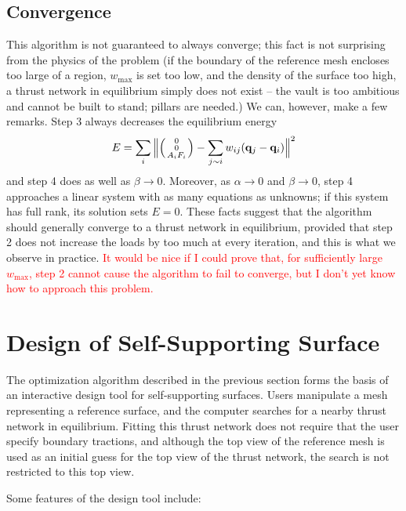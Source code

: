 \documentclass[annual]{acmsiggraph}
\makeatletter
\def\Forcevector{\Big(\mbox{\scriptsize
	\def\arraystretch{0.8}\begin{tabular}{@{\,}c@{\,}}
	0 \\ 0 \\ $A_i F_i$
	\end{tabular}}\Big)}
\newcommand{\todo}[1]{\textcolor{red}{#1}}
\makeatother
\begin{document}
\subsection{Convergence} This algorithm is not guaranteed to always 
converge; this fact is not surprising from the physics of the problem (if 
the boundary of the reference mesh encloses too large of a region, 
$w_{\max}$ is set too low, and the density of the surface too high, a 
thrust network in equilibrium simply does not exist -- the vault is too 
ambitious and cannot be built to stand; pillars are needed.) We can, 
however, make a few remarks. Step 3 always decreases the equilibrium 
energy
	$$
	E=\sum_i \Big\|\Forcevector-
		\sum_{j\sim i} w_{ij} (\qw_j - \qw_i) \Big\|^2
	$$
 and step 4 does as well as $\beta \to 0$. Moreover, as $\alpha \to 0$ and 
$\beta \to 0$, step 4 approaches a linear system with as many equations as 
unknowns; if this system has full rank, its solution sets $E=0$. These 
facts suggest that the algorithm should generally converge to a thrust 
network in equilibrium, provided that step 2 does not increase the loads 
by too much at every iteration, and this is what we observe in practice.  
\todo{It would be nice if I could prove that, for sufficiently large 
$w_{\textrm{max}}$, step 2 cannot cause the algorithm to fail to converge, 
but I don't yet know how to approach this problem.}

\section{Design of Self-Supporting Surface} \label{sec:design}

The optimization algorithm described in the previous section forms the 
basis of an interactive design tool for self-supporting surfaces. Users 
manipulate a mesh representing a reference surface, and the computer 
searches for a nearby thrust network in equilibrium. Fitting this thrust 
network does not require that the user specify boundary tractions, and 
although the top view of the reference mesh is used as an initial guess 
for the top view of the thrust network, the search is not restricted to 
this top view.

Some features of the design tool include:
\end{document}
